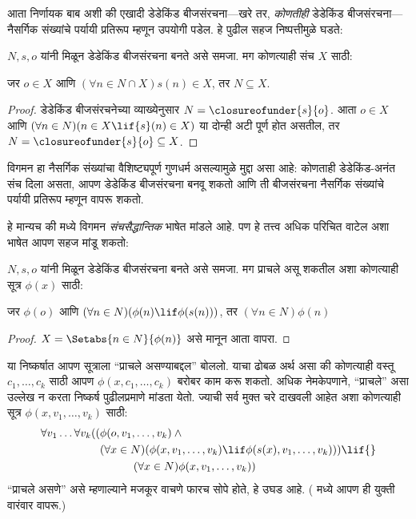 \documentclass[../../../include/open-logic-section]{subfiles}
\begin{document}

आता निर्णायक बाब अशी की एखादी डेडेकिंड बीजसंरचना---खरे तर,
\emph{कोणतीही} डेडेकिंड बीजसंरचना---नैसर्गिक संख्यांचे पर्यायी प्रतिरूप
म्हणून उपयोगी पडेल. हे पुढील सहज निष्पत्तीमुळे घडते:

\begin{thm}
$N, s, o$ यांनी मिळून डेडेकिंड बीजसंरचना बनते असे समजा. मग कोणत्याही
संच $X$ साठी:
	\begin{center}
		जर $o \in X$ आणि $(\forall {n} \in N \cap X){s}({n}) \in X$, {तर} $N \subseteq X$.
	\end{center}
\end{thm}

\begin{proof}
डेडेकिंड बीजसंरचनेच्या व्याख्येनुसार $N = \closureofunder{s}{o}$.
आता ${o} \in X$ आणि $(\forall {n} \in N)(n \in X \lif
{s}({n}) \in X)$ या दोन्ही अटी पूर्ण होत असतील, तर
$N = \closureofunder{s}{o} \subseteq X$.
\end{proof}

विगमन हा नैसर्गिक संख्यांचा वैशिष्ट्यपूर्ण गुणधर्म असल्यामुळे मुद्दा असा
आहे: कोणताही डेडेकिंड-अनंत संच दिला असता, आपण डेडेकिंड बीजसंरचना बनवू
शकतो आणि ती बीजसंरचना नैसर्गिक संख्यांचे पर्यायी प्रतिरूप म्हणून वापरू
शकतो.

हे मान्यच की  मध्ये विगमन
\emph{संचसैद्धान्तिक} भाषेत मांडले आहे. पण हे तत्त्व अधिक परिचित वाटेल
अशा भाषेत आपण सहज मांडू शकतो:

\begin{cor}
$N, s, o$ यांनी मिळून डेडेकिंड बीजसंरचना बनते असे समजा. मग प्राचले असू
शकतील अशा कोणत्याही सूत्र $\phi(x)$ साठी:
\begin{center}
	जर $\phi(o)$ आणि $(\forall {n} \in N)(\phi(n)\lif
	\phi({s}({n})))$, {तर} $(\forall n \in N)\phi(n)$
\end{center}
\end{cor}

\begin{proof}
$X = \Setabs{n \in N}{\phi(n)}$ असे मानून आता
 वापरा.
\end{proof}

या निष्कर्षात आपण सूत्राला ``प्राचले असण्याबद्दल'' बोललो. याचा ढोबळ
अर्थ असा की कोणत्याही वस्तू $c_1, \ldots, c_k$ साठी आपण
$\phi(x, c_1, \ldots, c_k)$ बरोबर काम करू शकतो. अधिक नेमकेपणाने,
``प्राचले'' असा उल्लेख न करता निष्कर्ष पुढीलप्रमाणे मांडता येतो.
ज्याची सर्व मुक्त चरे दाखवली आहेत अशा कोणत्याही सूत्र
$\phi(x, v_1, \ldots, v_k)$ साठी:
	\begin{align*}
			\forall v_1 \ldots \forall v_k((&\phi(o, v_1,\ldots, v_k) \land {}\\
			&	(\forall x \in N)(\phi(x,v_1, \ldots, v_k) \lif \phi(s(x), v_1,\ldots, v_k))) \lif {}\\
			&\hspace{3em} (\forall x \in N)\phi(x, v_1,\ldots, v_k))
	\end{align*}
``प्राचले असणे'' असे म्हणाल्याने मजकूर वाचणे फारच सोपे होते, हे उघड आहे.
( मध्ये आपण ही युक्ती वारंवार वापरू.)
\end{document}
